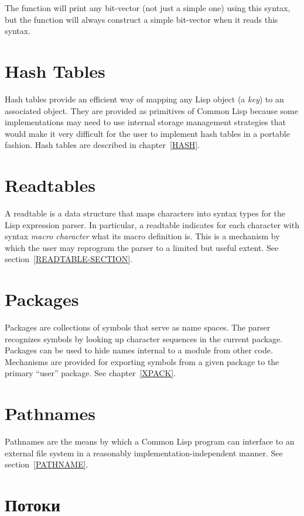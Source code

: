 The function  will print any bit-vector (not just a simple one)
using this syntax, but the function  will always construct
a simple bit-vector when it reads this syntax.

\section{Hash Tables}
Hash tables provide an efficient way of mapping any
Lisp object (a \emph{key}) to an associated object.
They are provided as primitives of Common Lisp because
some implementations may need to use internal storage
management strategies that would make it very difficult
for the user to implement hash tables in a portable fashion.
Hash tables are described in chapter~\ref{HASH}.

\section{Readtables}

A readtable is a data structure that maps characters into syntax
types for the Lisp expression parser.
In particular, a readtable indicates for
each character with syntax \emph{macro character} what its macro
definition is.  This is a mechanism by which the user may reprogram
the parser to a limited but useful extent.
See section~\ref{READTABLE-SECTION}.

\section{Packages}

Packages are collections of symbols that serve as name spaces.
The parser recognizes symbols by looking up character sequences
in the current package.  Packages can be used to hide
names internal to a module from other code.  Mechanisms are provided
for exporting symbols from a given package to the primary ``user'' package.
See chapter~\ref{XPACK}.

\section{Pathnames}
Pathnames are the means by which a Common Lisp program can
interface to an external file system in a reasonably implementation-independent
manner.  See section~\ref{PATHNAME}.

\section{Потоки}

